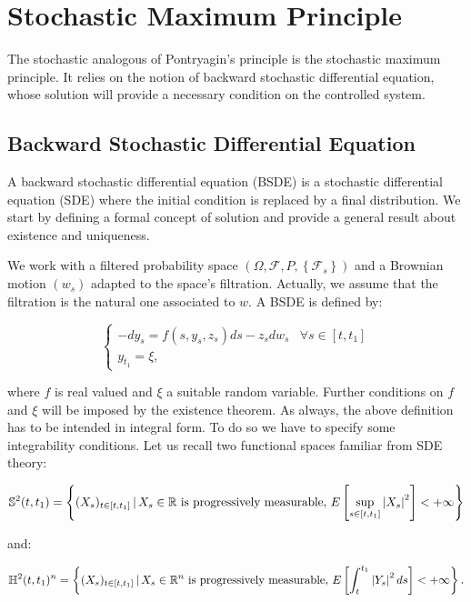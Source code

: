 \section{Stochastic Maximum Principle}

The stochastic analogous of Pontryagin's principle is the stochastic maximum principle. It relies on the notion of 
backward stochastic differential equation, whose solution will provide a necessary condition on the controlled system. 

\subsection{Backward Stochastic Differential Equation}

A backward stochastic differential equation (BSDE) is a stochastic differential equation (SDE) where the initial condition is replaced by a final distribution. We 
start by defining a formal concept of solution and provide a general result about existence and uniqueness. 

We work with a filtered probability space $(\Omega,\mathcal{F}, P, \left\{\mathcal{F}_s\right\})$ and a Brownian motion $(w_s)$ adapted 
to the space's filtration. Actually, we assume that the filtration is the natural one associated to $w$. A BSDE is defined by:

\begin{equation}\label{2-3-defBSDE}
    \begin{cases}
        - dy_s = f(s,y_s,z_s)ds - z_sdw_s & \forall s\in[t,t_1]\\
        y_{t_1} = \xi, 
    \end{cases}
\end{equation}

where $f$ is real valued and $\xi$ a suitable random variable. Further conditions on $f$ and $\xi$ will be imposed 
by the existence theorem. As always, the above definition has to be intended in integral form. To do so we have to specify some integrability conditions. Let us recall two functional spaces familiar from SDE theory:

\begin{equation}\label{2-3-defS}
    \mathbb{S}^2(t,t_1) = \left\{(X_s)_{t\in[t,t_1]}\,|\, X_s\in\mathbb{R} \text{ is progressively measurable},\, E\left[\sup_{s\in[t,t_1]}\abs{X_s}^2\right]<+\infty\right\}
\end{equation}

and:

\begin{equation}\label{2-3-defH}
    \mathbb{H}^2(t,t_1)^n = \left\{(X_s)_{t\in[t,t_1]}\,|\, X_s\in\mathbb{R}^n \text{ is progressively measurable},\, E\left[\int_t^{t_1} \abs{Y_s}^2\,ds\right]<+\infty\right\}.    
\end{equation}

